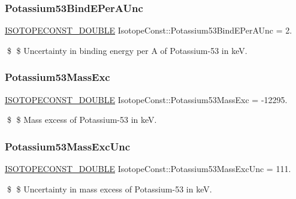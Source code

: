 \subsubsection{\texorpdfstring{Potassium53\+Bind\+E\+Per\+A\+Unc}{Potassium53BindEPerAUnc}}
{\footnotesize\ttfamily \mbox{\hyperlink{group___isotope_const-_macros_ga8f45a7272ce02c0b4c65c44636ed719a}{I\+S\+O\+T\+O\+P\+E\+C\+O\+N\+S\+T\+\_\+\+D\+O\+U\+B\+LE}} Isotope\+Const\+::\+Potassium53\+Bind\+E\+Per\+A\+Unc = 2.}

\$ \$ Uncertainty in binding energy per A of Potassium-\/53 in keV. \mbox{\label{group___isotope_const-_potassium-_k53_ga40974d2579e42d3dc86b435949beae28}} 
\subsubsection{\texorpdfstring{Potassium53\+Mass\+Exc}{Potassium53MassExc}}
{\footnotesize\ttfamily \mbox{\hyperlink{group___isotope_const-_macros_ga8f45a7272ce02c0b4c65c44636ed719a}{I\+S\+O\+T\+O\+P\+E\+C\+O\+N\+S\+T\+\_\+\+D\+O\+U\+B\+LE}} Isotope\+Const\+::\+Potassium53\+Mass\+Exc = -\/12295.}

\$ \$ Mass excess of Potassium-\/53 in keV. \mbox{\label{group___isotope_const-_potassium-_k53_ga214d757c81f565f31485ef38189cfa0a}} 
\subsubsection{\texorpdfstring{Potassium53\+Mass\+Exc\+Unc}{Potassium53MassExcUnc}}
{\footnotesize\ttfamily \mbox{\hyperlink{group___isotope_const-_macros_ga8f45a7272ce02c0b4c65c44636ed719a}{I\+S\+O\+T\+O\+P\+E\+C\+O\+N\+S\+T\+\_\+\+D\+O\+U\+B\+LE}} Isotope\+Const\+::\+Potassium53\+Mass\+Exc\+Unc = 111.}

\$ \$ Uncertainty in mass excess of Potassium-\/53 in keV. \mbox{\label{group___isotope_const-_potassium-_k53_ga0f520ad60c020a23c2a04fa7cc415c54}} 
